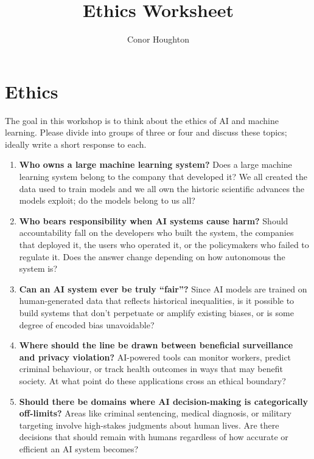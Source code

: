 \documentclass[a4paper,12pt]{article}
\title{Ethics Worksheet }
\author{Conor Houghton}
\date{}
\begin{document}
\maketitle

\section{Ethics}

The goal in this workshop is to think about the ethics of AI and
machine learning. Please divide into groups of three or four and
discuss these topics; ideally write a short response to each.

\begin{enumerate}


\item \textbf{Who owns a large machine learning system?} Does a large
  machine learning system belong to the company that developed it? We
  all created the data used to train models and we all own the
  historic scientific advances the models exploit; do the models
  belong to us all?


\item \textbf{Who bears responsibility when AI systems cause harm?}
  Should accountability fall on the developers who built the system,
  the companies that deployed it, the users who operated it, or the
  policymakers who failed to regulate it. Does the answer change
  depending on how autonomous the system is?

\item \textbf{Can an AI system ever be truly ``fair''?} Since AI
  models are trained on human-generated data that reflects historical
  inequalities, is it possible to build systems that don't perpetuate
  or amplify existing biases, or is some degree of encoded bias
  unavoidable?

\item \textbf{Where should the line be drawn between beneficial
    surveillance and privacy violation?} AI-powered tools can monitor
  workers, predict criminal behaviour, or track health outcomes in
  ways that may benefit society. At what point do these applications
  cross an ethical boundary?

\item \textbf{Should there be domains where AI decision-making is
    categorically off-limits?} Areas like criminal sentencing, medical
  diagnosis, or military targeting involve high-stakes judgments about
  human lives. Are there decisions that should remain with humans
  regardless of how accurate or efficient an AI system becomes?


\end{enumerate}
\end{document}

